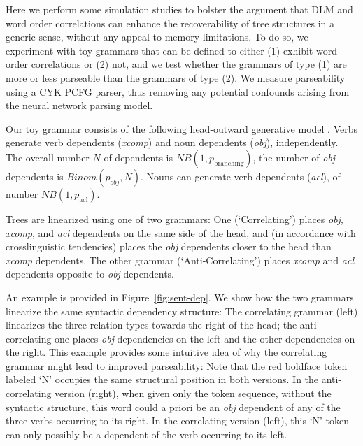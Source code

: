 \documentclass[10pt,twoside,lineno]{article}
\begin{document}
Here we perform some simulation studies to bolster the argument that DLM and word order correlations can enhance the recoverability of tree structures in a generic sense, without any appeal to memory limitations. To do so, we experiment with toy grammars that can be defined to either (1) exhibit word order correlations or (2) not, and we test whether the grammars of type (1) are more or less parseable than the grammars of type (2). We measure parseability using a CYK PCFG parser, thus removing any potential confounds arising from the neural network parsing model.

Our toy grammar consists of the following head-outward generative model \citep{eisner1996three}.
Verbs generate verb dependents (\emph{xcomp}) and noun dependents (\emph{obj}), independently.
The overall number $N$ of dependents is $NB(1, p_\text{branching})$, the number of \emph{obj} dependents is $Binom(p_{obj}, N)$.
Nouns can generate verb dependents (\emph{acl}), of number $NB(1, p_\text{acl})$.

Trees are linearized using one of two grammars: One (`Correlating') places \emph{obj}, \emph{xcomp}, and \emph{acl} dependents on the same side of the head, and (in accordance with crosslinguistic tendencies) places the \emph{obj} dependents closer to the head than \emph{xcomp} dependents.
The other grammar (`Anti-Correlating') places \emph{xcomp} and \emph{acl} dependents opposite to \emph{obj} dependents.

An example is provided in Figure~\ref{fig:sent-dep}.
We show how the two grammars linearize the same syntactic dependency structure:
The correlating grammar (left) linearizes the three relation types towards the right of the head; the anti-correlating one places \emph{obj} dependencies on the left and the other dependencies on the right.
This example provides some intuitive idea of why the correlating grammar might lead to improved parseability:
Note that the red boldface token labeled `N' occupies the same structural position in both versions.
In the anti-correlating version (right), when given only the token sequence, without the syntactic structure, this word could a priori be an \emph{obj} dependent of any of the three verbs occurring to its right.
In the correlating version (left), this `N' token can only possibly be a dependent of the verb occurring to its left.
\end{document}
